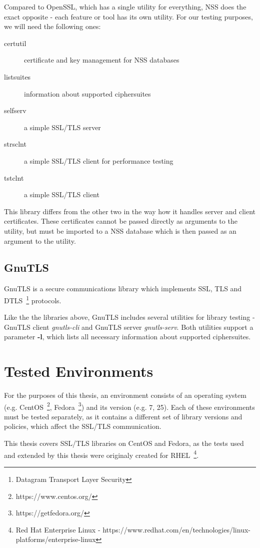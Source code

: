     Compared to OpenSSL, which has a single utility for everything, NSS does
    the exact opposite - each feature or tool has its own utility. For our
    testing purposes, we will need the following ones:
    \begin{description}
        \item [certutil] certificate and key management for NSS databases
        \item [listsuites] information about supported ciphersuites
        \item [selfserv] a simple SSL/TLS server
        \item [strsclnt] a simple SSL/TLS client for performance testing
        \item [tstclnt] a simple SSL/TLS client
    \end{description}

    This library differs from the other two in the way how it handles
    server and client certificates. These certificates cannot be passed
    directly as arguments to the utility, but must be imported to a NSS
    database which is then passed as an argument to the utility.

\subsection{GnuTLS}
    GnuTLS is a secure communications library which implements SSL, TLS and
    DTLS~\footnote{Datagram Transport Layer Security} protocols.

    Like the the libraries above, GnuTLS includes several utilities for library
    testing - GnuTLS client \textit{gnutls-cli} and GnuTLS server
    \textit{gnutls-serv}. Both utilities support a parameter \textbf{-l},
    which lists all necessary information about supported ciphersuites.

\section{Tested Environments}
    For the purposes of this thesis, an environment consists of an operating
    system (e.g.
    CentOS~\footnote{https://www.centos.org/},
    Fedora~\footnote{https://getfedora.org/}) and its version
    (e.g. 7, 25). Each of these environments must be tested separately, as
    it contains a different set of library versions and policies, which
    affect the SSL/TLS communication.

    This thesis covers SSL/TLS libraries on CentOS and Fedora, as the tests used
    and extended by this thesis were originaly created for
    RHEL~\footnote{Red Hat Enterprise Linux -
    https://www.redhat.com/en/technologies/linux-platforms/enterprise-linux}.


